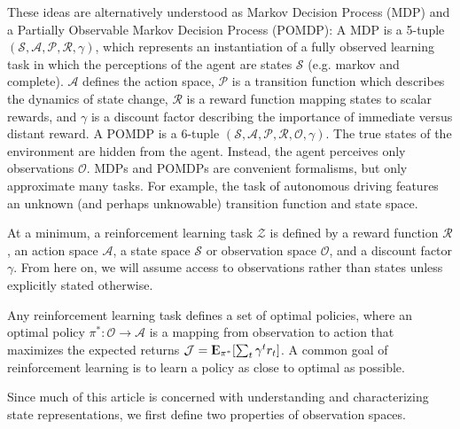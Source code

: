 \documentclass{article} %
\newcommand{\Expect}{{\rm I\kern-.3em E}}
\theoremstyle{definition}
\begin{document}
These ideas are alternatively understood as Markov Decision Process
(MDP) and a Partially Observable Markov Decision Process (POMDP): A
MDP is a 5-tuple $(\mathcal{S}, \mathcal{A}, \mathcal{P}, \mathcal{R},
\gamma)$, which represents an instantiation of a fully observed
learning task in which the perceptions of the agent are states
$\mathcal{S}$ (e.g. markov and complete). $\mathcal{A}$ defines the
action space, $\mathcal{P}$ is a transition function which describes
the dynamics of state change, $\mathcal{R}$ is a reward function
mapping states to scalar rewards, and $\gamma$ is a discount factor
describing the importance of immediate versus distant reward. A POMDP
is a 6-tuple $(\mathcal{S}, \mathcal{A}, \mathcal{P}, \mathcal{R},
\mathcal{O}, \gamma)$. The true states of the environment are hidden
from the agent. Instead, the agent perceives only observations
$\mathcal{O}$. MDPs and POMDPs are convenient formalisms, but only
approximate many tasks. For example, the task of autonomous driving
features an unknown (and perhaps unknowable) transition function and
state space.

At a minimum, a reinforcement learning task $\mathcal{Z}$ is defined
by a reward function $\mathcal{R}$, an action space $\mathcal{A}$, a
state space $\mathcal{S}$ or observation space $\mathcal{O}$, and a
discount factor $\gamma$. From here on, we will assume access to
observations rather than states unless explicitly stated otherwise.

Any reinforcement learning task defines a set of optimal policies,
where an optimal policy $\pi^*: \mathcal{O} \rightarrow \mathcal{A}$
is a mapping from observation to action that maximizes the expected
returns $\mathcal{J} = \Expect_{\pi^*}[\sum_{t} \gamma^t r_t]$. A
common goal of reinforcement learning is to learn a policy as close to
optimal as possible.

Since much of this article is concerned with understanding and
characterizing state representations, we first define two properties
of observation spaces.
\end{document}
